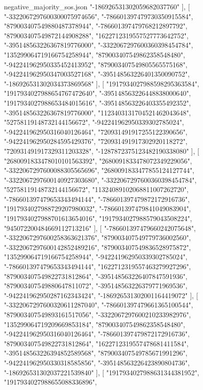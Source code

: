 \begin{filecontents*}[overwrite]{negative_majority_sos.json}
    "-186926531302059682037760"
   ],
   [
    "-3322067297600300075974656",
    "-786601397479730350915584",
    "879003407549880487378944",
    "-786601397479768212897792",
    "879003407549872144908288",
    "1622712319557527773642752",
    "-395148563226367819776000",
    "-3322067297600360398454784",
    "135299064719166754258944",
    "879003407549862358548480",
    "-942241962950335452413952",
    "879003407549805565575168",
    "-942241962950347003527168",
    "-395148563226401350090752",
    "-186926531302034373869568"
   ],
   [
    "1917934027988598295363584",
    "1917934027988654767472640",
    "-395148563226448838000640",
    "1917934027988653484015616",
    "-395148563226403355492352",
    "-395148563226367819776000",
    "1123403131704521462043648",
    "52758119148732144156672",
    "-942241962950339302785024",
    "-942241962950316040126464",
    "720931491917255122390656",
    "-942241962950284595429376",
    "720931491917302920118272",
    "720931491917329311203328",
    "-1287872375123482190338080"
   ],
   [
    "2680091833478010101563392",
    "2680091833478072349229056",
    "-3322067297600088305565696",
    "2680091833477855124127744",
    "-3322067297600140927303680",
    "-3322067297600360398454784",
    "52758119148732144156672",
    "11324089102068811007262720",
    "-786601397479653343494144",
    "-786601397479872172916736",
    "1917934027988729207980032",
    "-786601397479841049083904",
    "1917934027988701613654016",
    "1917934027988579043508224",
    "945072200484669112713216"
   ],
   [
    "-786601397479660242075648",
    "-3322067297600258363621376",
    "879003407549779736002560",
    "-3322067297600142852489216",
    "879003407549836528975872",
    "135299064719166754258944",
    "-942241962950339302785024",
    "-786601397479653343494144",
    "1622712319557463279927296",
    "879003407549822731812864",
    "-395148563226407847591936",
    "879003407549880647811072",
    "-395148563226379771969536",
    "-942241962950287162343424",
    "-186926531302001164419072"
   ],
   [
    "-3322067297600320611287040",
    "-786601397479661365100544",
    "879003407549893161517056",
    "-3322067297600210233982976",
    "135299064719209669853184",
    "879003407549862358548480",
    "-942241962950316040126464",
    "-786601397479872172916736",
    "879003407549822731812864",
    "1622712319557478681411584",
    "-395148563226394852589568",
    "879003407549785671991296",
    "-942241962950330318585856",
    "-395148563226423890804736",
    "-186926531302037221539840"
   ],
   [
    "1917934027988631344381952",
    "1917934027988655088336896",

\end{filecontents*}
